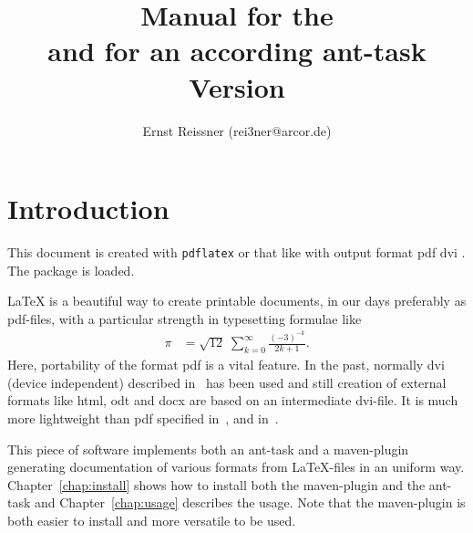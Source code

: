 \documentclass[12pt]{book}
\title{Manual for the \artifactId{} \protect\\
  and for an according ant-task \protect\\
Version \strippedVersionID}
\author{Ernst Reissner (rei3ner@arcor.de)}
\date{\versionDate}
\newcommand{\gls}[1]{#1}
\renewcommand{\lstlistoflistings}{\begingroup
\tocfile{\lstlistingname}{lol}
\endgroup}
\renewcommand{\lstlistoflistings}{\begingroup
\tocfile{List of \lstlistingname{}s}{lol}
\endgroup}
\begin{document}
\maketitle

\tableofcontents
\listoffigures
\listoftables
\lstlistoflistings


\chapter{Introduction}

This document is created with \texttt{pdflatex} or that like 
with output format 
\ifpdf%
pdf%
\else
dvi%
\fi.
The package  
is  loaded. 

\LaTeX{} is a beautiful way to create printable documents, 
in our days preferably as \gls{pdf}-files, 
with a particular strength in typesetting formulae like
%
%
\begin{align}
\pi & = \sqrt{12}\;\sum^\infty_{k=0} \frac{(-3)^{-k}}{2k+1}. %
\end{align}
%
Here, portability of the format \gls{pdf} is a vital feature. 
In the past, normally \gls{dvi} (device independent)
described in~\cite{DviF} has been used 
and still creation of external formats like \gls{html}, 
\gls{odt} and \gls{docx} are based on an intermediate \gls{dvi}-file.
It is much more lightweight than pdf specified in~\cite{Pdf1}, \cite{Pdf2}
and in~\cite{Pdf3}.

This piece of software implements both an ant-task and a maven-plugin 
generating documentation of various formats from \LaTeX-files 
in an uniform way. 
Chapter~\ref{chap:install} shows how to install both the maven-plugin 
and the ant-task 
and Chapter~\ref{chap:usage} describes the usage. 
Note that the maven-plugin is both easier to install 
and more versatile to be used. 
\end{document}
